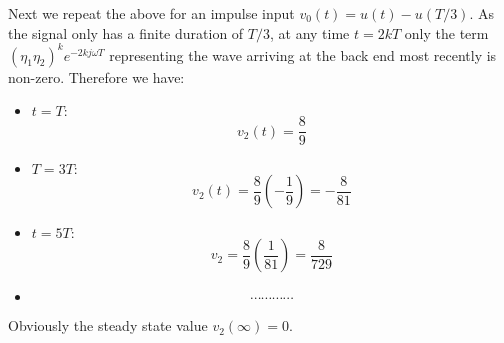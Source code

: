 \begin{itemize}
  Next we repeat the above for an impulse input $v_0(t)=u(t)-u(T/3)$. As the
  signal only has a finite duration of $T/3$, at any time $t=2kT$ only the term 
  $(\eta_1\eta_2)^k e^{-2kj\omega T}$ representing the wave arriving at the back end
  most recently is non-zero. Therefore we have:
  \begin{itemize}
  \item $t=T:$ 
    \[	v_2(t)=\frac{8}{9}	\]
  \item $T=3T:$ 
    \[ v_2(t)=\frac{8}{9}\left(-\frac{1}{9}\right)=-\frac{8}{81} \]
  \item $t=5T:$ 
    \[ v_2=\frac{8}{9}\left(\frac{1}{81}\right)=\frac{8}{729}	\]    
  \item
    \[	\cdots  \cdots  \cdots  \cdots  \]
  \end{itemize}
  Obviously the steady state value $v_2(\infty)=0$.

\end{itemize}




